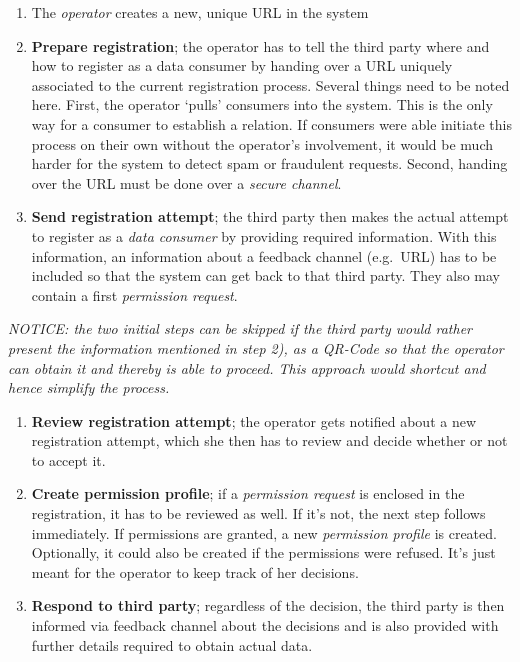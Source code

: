 \documentclass[12pt,english,a4paper,titlepage,cleardoublepage=empty,dottedtoc]{report}
\begin{document}
\begin{enumerate}
\def\labelenumi{\arabic{enumi})}
\setcounter{enumi}{-1}
\item
  The \emph{operator} creates a new, unique URL in the system
\item
  \textbf{Prepare registration}; the operator has to tell the third
  party where and how to register as a data consumer by handing over a
  URL uniquely associated to the current registration process. Several
  things need to be noted here. First, the operator `pulls' consumers
  into the system. This is the only way for a consumer to establish a
  relation. If consumers were able initiate this process on their own
  without the operator's involvement, it would be much harder for the
  system to detect spam or fraudulent requests. Second, handing over the
  URL must be done over a \emph{secure channel}.
\item
  \textbf{Send registration attempt}; the third party then makes the
  actual attempt to register as a \emph{data consumer} by providing
  required information. With this information, an information about a
  feedback channel (e.g.~URL) has to be included so that the system can
  get back to that third party. They also may contain a first
  \emph{permission request}.
\end{enumerate}

\emph{NOTICE: the two initial steps can be skipped if the third party
would rather present the information mentioned in step 2), as a QR-Code
so that the operator can obtain it and thereby is able to proceed. This
approach would shortcut and hence simplify the process.}

\begin{enumerate}
\def\labelenumi{\arabic{enumi})}
\setcounter{enumi}{2}
\item
  \textbf{Review registration attempt}; the operator gets notified about
  a new registration attempt, which she then has to review and decide
  whether or not to accept it.
\item
  \textbf{Create permission profile}; if a \emph{permission request} is
  enclosed in the registration, it has to be reviewed as well. If it's
  not, the next step follows immediately. If permissions are granted, a
  new \emph{permission profile} is created. Optionally, it could also be
  created if the permissions were refused. It's just meant for the
  operator to keep track of her decisions.
\item
  \textbf{Respond to third party}; regardless of the decision, the third
  party is then informed via feedback channel about the decisions and is
  also provided with further details required to obtain actual data.
\end{enumerate}
\end{document}
